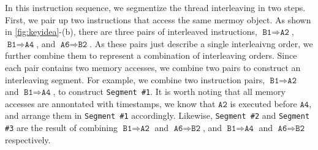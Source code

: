 In this instruction sequence, we segmentize the thread interleaving in
two steps. First, we pair up two instructions that access the same
mermoy object.
%
As shown in \autoref{fig:keyidea}-(b), there are three pairs of
interleaved instructions, $\texttt{B1} \Rightarrow \texttt{A2}$,
$\texttt{B1} \Rightarrow \texttt{A4}$, and
$\texttt{A6} \Rightarrow \texttt{B2}$.
%
As these pairs just describe a single interleaivng order, we further
combine them to represent a combination of interleaving orders.
%
Since each pair contains two memory accesses, we combine two pairs to
construct an interleaving segment.
%
For example, we combine two instruction pairs,
$\texttt{B1} \Rightarrow \texttt{A2}$ and
$\texttt{B1} \Rightarrow \texttt{A4}$, to construct \texttt{Segment
  \#1}.
%
It is worth noting that all memory accesses are annontated with
timestamps, we know that $\texttt{A2}$ is executed before
$\texttt{A4}$, and arrange them in \texttt{Segment \#1} accordingly.
%
Likewise, \texttt{Segment \#2} and \texttt{Segment \#3} are the result
of combining $\texttt{B1} \Rightarrow \texttt{A2}$ and
$\texttt{A6} \Rightarrow \texttt{B2}$, and
$\texttt{B1} \Rightarrow \texttt{A4}$ and
$\texttt{A6} \Rightarrow \texttt{B2}$ respectively.

%
%




